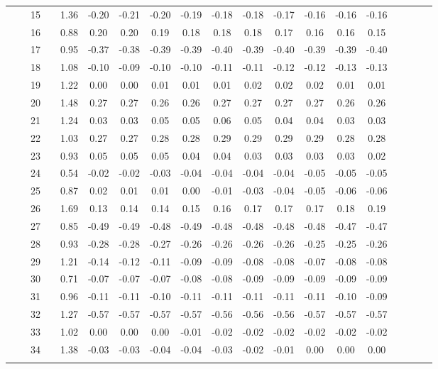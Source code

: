 \documentclass[a4paper，11pt，oneside，openany]{jsbook}
\newcommand{\bhline}[1]{\noalign{\hrule height #1}}
\begin{document}
\begin{table}[h!]
\begin{center}
\begin{tabular}{ccccccccccccccccccc}
 &  & 15 &  & 1.36 & -0.20 & -0.21 & -0.20 & -0.19 & -0.18 & -0.18 & -0.17 & -0.16 & -0.16 & -0.16 \\
 &  & 16 &  & 0.88 & 0.20  & 0.20  & 0.19  & 0.18  & 0.18  & 0.18  & 0.17  & 0.16  & 0.16  & 0.15  \\
 &  & 17 &  & 0.95 & -0.37 & -0.38 & -0.39 & -0.39 & -0.40 & -0.39 & -0.40 & -0.39 & -0.39 & -0.40 \\
 &  & 18 &  & 1.08 & -0.10 & -0.09 & -0.10 & -0.10 & -0.11 & -0.11 & -0.12 & -0.12 & -0.13 & -0.13 \\
 &  & 19 &  & 1.22 & 0.00  & 0.00  & 0.01  & 0.01  & 0.01  & 0.02  & 0.02  & 0.02  & 0.01  & 0.01  \\
 &  & 20 &  & 1.48 & 0.27  & 0.27  & 0.26  & 0.26  & 0.27  & 0.27  & 0.27  & 0.27  & 0.26  & 0.26  \\
 &  & 21 &  & 1.24 & 0.03  & 0.03  & 0.05  & 0.05  & 0.06  & 0.05  & 0.04  & 0.04  & 0.03  & 0.03  \\
 &  & 22 &  & 1.03 & 0.27  & 0.27  & 0.28  & 0.28  & 0.29  & 0.29  & 0.29  & 0.29  & 0.28  & 0.28  \\
 &  & 23 &  & 0.93 & 0.05  & 0.05  & 0.05  & 0.04  & 0.04  & 0.03  & 0.03  & 0.03  & 0.03  & 0.02  \\
 &  & 24 &  & 0.54 & -0.02 & -0.02 & -0.03 & -0.04 & -0.04 & -0.04 & -0.04 & -0.05 & -0.05 & -0.05 \\
 &  & 25 &  & 0.87 & 0.02  & 0.01  & 0.01  & 0.00  & -0.01 & -0.03 & -0.04 & -0.05 & -0.06 & -0.06 \\
 &  & 26 &  & 1.69 & 0.13  & 0.14  & 0.14  & 0.15  & 0.16  & 0.17  & 0.17  & 0.17  & 0.18  & 0.19  \\
 &  & 27 &  & 0.85 & -0.49 & -0.49 & -0.48 & -0.49 & -0.48 & -0.48 & -0.48 & -0.48 & -0.47 & -0.47 \\
 &  & 28 &  & 0.93 & -0.28 & -0.28 & -0.27 & -0.26 & -0.26 & -0.26 & -0.26 & -0.25 & -0.25 & -0.26 \\
 &  & 29 &  & 1.21 & -0.14 & -0.12 & -0.11 & -0.09 & -0.09 & -0.08 & -0.08 & -0.07 & -0.08 & -0.08 \\
 &  & 30 &  & 0.71 & -0.07 & -0.07 & -0.07 & -0.08 & -0.08 & -0.09 & -0.09 & -0.09 & -0.09 & -0.09 \\
 &  & 31 &  & 0.96 & -0.11 & -0.11 & -0.10 & -0.11 & -0.11 & -0.11 & -0.11 & -0.11 & -0.10 & -0.09 \\
 &  & 32 &  & 1.27 & -0.57 & -0.57 & -0.57 & -0.57 & -0.56 & -0.56 & -0.56 & -0.57 & -0.57 & -0.57 \\
 &  & 33 &  & 1.02 & 0.00  & 0.00  & 0.00  & -0.01 & -0.02 & -0.02 & -0.02 & -0.02 & -0.02 & -0.02 \\
 &  & 34 &  & 1.38 & -0.03 & -0.03 & -0.04 & -0.04 & -0.03 & -0.02 & -0.01 & 0.00  & 0.00  & 0.00 \\
\bhline{1pt}
\end{tabular}
\label{t10param1}
\end{center}
\end{table}
\end{document}
